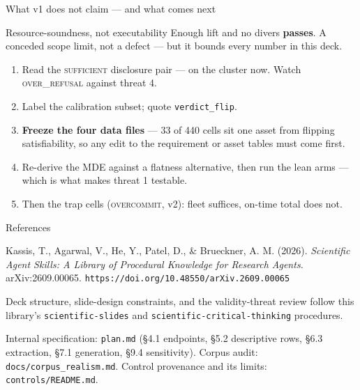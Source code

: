 \documentclass[aspectratio=169,11pt]{beamer}
\newcommand{\cs}[1]{\textsc{\small #1}}
\begin{document}
\begin{frame}{What v1 does not claim --- and what comes next}

\begin{block}{Resource-soundness, not executability}
Enough lift and no divers \textbf{passes}. A conceded scope limit, not a defect --- but
it bounds every number in this deck.
\end{block}

\vfill
\begin{enumerate}
  \item Read the \cs{sufficient} disclosure pair --- on the cluster now. Watch
        \cs{over\_refusal} against threat 4.
  \item Label the calibration subset; quote \texttt{verdict\_flip}.
  \item \textbf{Freeze the four data files} --- 33 of 440 cells sit one asset from
        flipping satisfiability, so any edit to the requirement or asset tables must come
        first.
  \item Re-derive the MDE against a flatness alternative, then run the lean arms ---
        which is what makes threat 1 testable.
  \item Then the trap cells (\cs{overcommit}, v2): fleet suffices, on-time total does
        not.
\end{enumerate}

\end{frame}

\begin{frame}{References}

\footnotesize
Kassis, T., Agarwal, V., He, Y., Patel, D., \& Brueckner, A. M. (2026).
\textit{Scientific Agent Skills: A Library of Procedural Knowledge for Research Agents.}
arXiv:2609.00065. \texttt{https://doi.org/10.48550/arXiv.2609.00065}

\medskip
{\scriptsize\textcolor{inkfaint}{Deck structure, slide-design constraints, and the
validity-threat review follow this library's \texttt{scientific-slides} and
\texttt{scientific-critical-thinking} procedures.}}

\vfill
{\footnotesize\textcolor{inkfaint}{Internal specification: \texttt{plan.md} (\S4.1
endpoints, \S5.2 descriptive rows, \S6.3 extraction, \S7.1 generation, \S9.4
sensitivity). Corpus audit: \texttt{docs/corpus\_realism.md}. Control provenance and its
limits: \texttt{controls/README.md}.}}

\end{frame}
\end{document}
